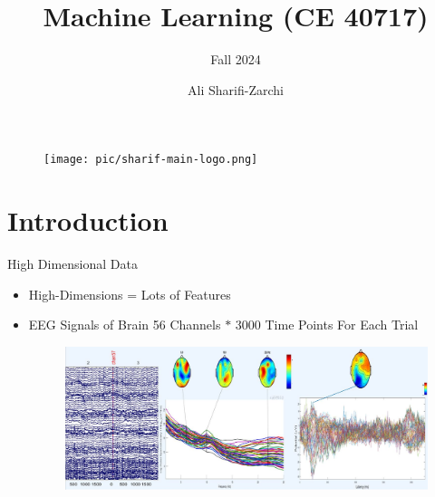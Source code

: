 \documentclass[serif, aspectratio=169]{beamer}
\author{Ali Sharifi-Zarchi}
\title{Machine Learning (CE 40717)}
\subtitle{Fall 2024}
\institute{
    CE Department \\
    Sharif University of Technology
}
\begin{document}
\begin{frame}
    \titlepage
    \vspace*{-0.6cm}
    \begin{figure}[htpb]
        \begin{center}
            \texttt{[image: pic/sharif-main-logo.png]}
        \end{center}
    \end{figure}
\end{frame}

\begin{frame}    
\tableofcontents[sectionstyle=show,
subsectionstyle=show/shaded/hide,
subsubsectionstyle=show/shaded/hide]
\end{frame}

\section{Introduction}

\begin{frame}{High Dimensional Data}
    \begin{itemize}
        \item High-Dimensions  = Lots of	Features
        \item EEG Signals of Brain 
        56 Channels $*$ 3000 Time Points For Each Trial

        \begin{figure}[htpb]
            \begin{center}
                \includegraphics[keepaspectratio, scale=0.4]{pic/brain.JPG}
            \end{center}
        \end{figure}
    \end{itemize}
\end{frame}
\end{document}
